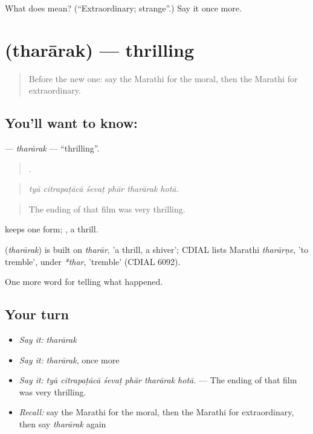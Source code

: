 \begin{tcolorbox}[breakable,colback=teal!4,colframe=teal!35!black,title={Before you move on}]
What does  mean? (\textquotedblleft{}Extraordinary; strange\textquotedblright{}.) Say it once more.
\end{tcolorbox}
\section[\texorpdfstring{\mr{थरारक} (tharārak)}{थरारक (tharārak)}]{ (tharārak) — thrilling}

\label{lesson:MR-C340-thararak}



\begin{quote}
Before the new one: say the Marathi for the moral, then the Marathi for extraordinary.
\end{quote}

\subsection*{You'll want to know: }
\textbf{} — \emph{tharārak} — \textquotedblleft{}thrilling\textquotedblright{}.

\begin{quote}
     .
\end{quote}

\begin{quote}
\emph{tyā citrapaṭācā śevaṭ phār tharārak hotā.}
\end{quote}

\begin{quote}
The ending of that film was very thrilling.
\end{quote}

 keeps one form; , a thrill.

\begin{cousinweb}
\textbf{} (\emph{tharārak}) is built on \emph{tharār}, 'a thrill, a shiver'; CDIAL lists Marathi \emph{tharārṇe}, 'to tremble', under \emph{*thar}, 'tremble' (CDIAL 6092).
\end{cousinweb}

\begin{grammarlens}[title={What you've built}]
One more word for telling what happened.
\end{grammarlens}

\subsection*{Your turn}
\begin{itemize}
\raggedright
  \item \emph{Say it:} \emph{tharārak}
  \item \emph{Say it:} \emph{tharārak}, once more
  \item \emph{Say it:} \emph{tyā citrapaṭācā śevaṭ phār tharārak hotā.} — The ending of that film was very thrilling.
  \item \emph{Recall:} say the Marathi for the moral, then the Marathi for extraordinary, then say \emph{tharārak} again
\end{itemize}

